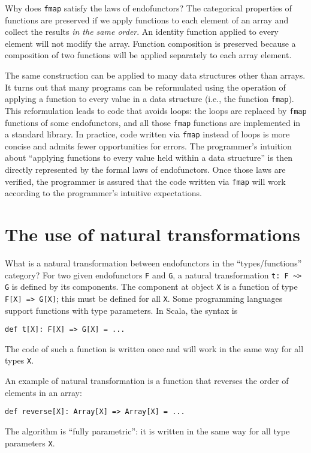 Why does \lstinline!fmap! satisfy the laws of endofunctors? The categorical
properties of functions are preserved if we apply functions to each
element of an array and collect the results \emph{in the same order}.
An identity function applied to every element will not modify the
array. Function composition is preserved because a composition of
two functions will be applied separately to each array element.

The same construction can be applied to many data structures other
than arrays. It turns out that many programs can be reformulated using
the operation of applying a function to every value in a data structure
(i.e., the function \lstinline!fmap!). This reformulation leads to
code that avoids loops: the loops are replaced by \lstinline!fmap!
functions of some endofunctors, and all those \lstinline!fmap! functions
are implemented in a standard library. In practice, code written via
\lstinline!fmap! instead of loops is more concise and admits fewer
opportunities for errors. The programmer\textsf{'}s intuition about \textsf{``}applying
functions to every value held within a data structure\textsf{''} is then directly
represented by the formal laws of endofunctors. Once those laws are
verified, the programmer is assured that the code written via \lstinline!fmap!
will work according to the programmer\textsf{'}s intuitive expectations.

\section{The use of natural transformations}

What is a natural transformation between endofunctors in the \textsf{``}types/functions\textsf{''}
category? For two given endofunctors \lstinline!F! and \lstinline!G!,
a natural transformation \lstinline!t: F ~> G! is defined by its
components. The component at object \lstinline!X! is a function of
type \lstinline!F[X] => G[X]!; this must be defined for all \lstinline!X!.
Some programming languages support functions with type parameters.
In Scala, the syntax is
\begin{lstlisting}
def t[X]: F[X] => G[X] = ...
\end{lstlisting}
The code of such a function is written once and will work in the same
way for all types \lstinline!X!.

An example of natural transformation is a function that reverses the
order of elements in an array:
\begin{lstlisting}
def reverse[X]: Array[X] => Array[X] = ...
\end{lstlisting}
The algorithm is \textsf{``}fully parametric\textsf{''}: it is written in the same
way for all type parameters \lstinline!X!.

